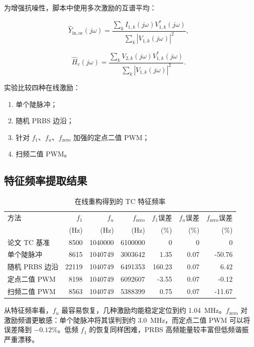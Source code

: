 \documentclass[UTF8,a4paper,12pt]{ctexart}
\begin{document}
为增强抗噪性，脚本中使用多次激励的互谱平均：

\begin{equation}
\hat{Y}_{\mathrm{in,oc}}(j\omega) =
\frac{\sum_k I_{1,k}(j\omega)V_{1,k}^{*}(j\omega)}
{\sum_k |V_{1,k}(j\omega)|^2},
\end{equation}

\begin{equation}
\hat{H}_{v}(j\omega) =
\frac{\sum_k V_{2,k}(j\omega)V_{1,k}^{*}(j\omega)}
{\sum_k |V_{1,k}(j\omega)|^2}.
\end{equation}

实验比较四种在线激励：

\begin{enumerate}
  \item 单个陡脉冲；
  \item 随机 PRBS 边沿；
  \item 针对 $f_1$、$f_u$、$f_{\mathrm{zero}}$ 加强的定点二值 PWM；
  \item 扫频二值 PWM。
\end{enumerate}

\subsection{特征频率提取结果}

\begin{table}[H]
\centering
\caption{在线重构得到的 TC 特征频率}
\scriptsize
\begin{tabular}{lrrrrrr}
\toprule
方法 & $f_1$ & $f_u$ & $f_{\mathrm{zero}}$ & $f_1$误差 & $f_u$误差 & $f_{\mathrm{zero}}$误差 \\
 & (Hz) & (Hz) & (Hz) & (\%) & (\%) & (\%) \\
\midrule
论文 TC 基准 & 8500 & 1040000 & 6100000 & 0 & 0 & 0 \\
单个陡脉冲 & 8615 & 1040749 & 3003642 & 1.35 & 0.07 & -50.76 \\
随机 PRBS 边沿 & 22119 & 1040749 & 6491353 & 160.23 & 0.07 & 6.42 \\
定点二值 PWM & 8198 & 1040749 & 6092607 & -3.55 & 0.07 & -0.12 \\
扫频二值 PWM & 8563 & 1040749 & 5388399 & 0.75 & 0.07 & -11.67 \\
\bottomrule
\end{tabular}
\end{table}

从特征频率看，$f_u$ 最容易恢复，几种激励均能稳定定位到约 \SI{1.04}{MHz}。$f_{\mathrm{zero}}$ 对激励频谱更敏感：单个陡脉冲将其误判到约 \SI{3.0}{MHz}，而定点二值 PWM 可以将误差降到 $-0.12\%$。低频 $f_1$ 的恢复同样困难，PRBS 高频能量较丰富但低频谐振严重漂移。
\end{document}
